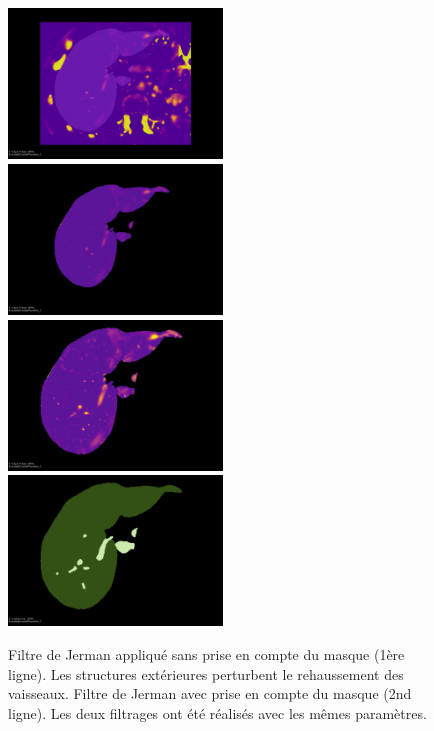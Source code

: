 \begin{figure}
  \centering
  \includegraphics[height=4cm]{Images/globInfo_noM_glob.png}
  \includegraphics[height=4cm]{Images/globInfo_noM_loc.png}
  \includegraphics[height=4cm]{Images/globInfo_M_loc.png}
  \includegraphics[height=4cm]{Images/globInfo_GT.png}
  \label{fig:smart_mask_effect}
  \caption{Filtre de Jerman appliqué sans prise en compte du masque (1ère ligne). Les structures extérieures perturbent le rehaussement des vaisseaux. Filtre de Jerman avec prise en compte du masque (2nd ligne). Les deux filtrages ont été réalisés avec les mêmes paramètres.}
\end{figure}


